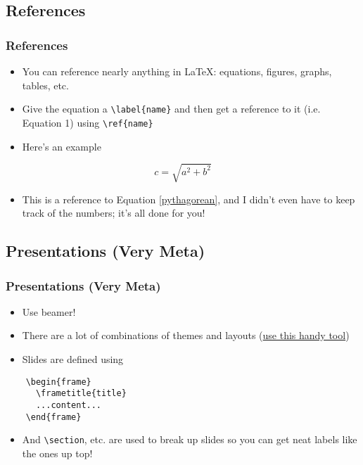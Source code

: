 \documentclass{beamer}
\begin{document}
\subsection{References}
\begin{frame}[fragile]
	\frametitle{References}
  \begin{itemize}
    \item You can reference nearly anything in \LaTeX: equations, figures, graphs, tables, etc.
    \item Give the equation a \verb.\label{name}. and then get a reference to it (i.e. Equation 1) using \verb.\ref{name}.
    \item Here's an example
  \end{itemize}
  \begin{equation}
    \label{pythagorean}
    c = \sqrt{a^2 + b^2}
  \end{equation}
  \begin{itemize}
    \item This is a reference to Equation \ref{pythagorean}, and I didn't even have to keep track of the numbers; it's all done for you!
  \end{itemize}
\end{frame}

\subsection{Presentations (Very Meta)}
\begin{frame}[fragile]
	\frametitle{Presentations (Very Meta)}
  \begin{itemize}
    \item Use beamer!
    \item There are a lot of combinations of themes and layouts (\href{http://www.hartwork.org/beamer-theme-matrix/}{use this handy tool})
    \item Slides are defined using
  \end{itemize}
  \begin{verbatim}
    \begin{frame}
      \frametitle{title}
      ...content...
    \end{frame}
  \end{verbatim}
  \begin{itemize}
    \item And \verb.\section., etc. are used to break up slides so you can get neat labels like the ones up top!
  \end{itemize}
\end{frame}
\end{document}
